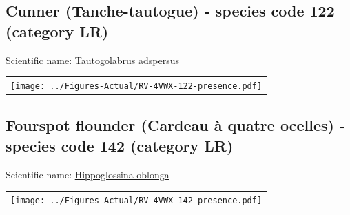 \documentclass[12pt]{article}\usepackage[]{graphicx}\usepackage[]{color}
\begin{document}
\renewcommand\thefigure{\thesubsection\Alph{figure}}

\setcounter{figure}{0}

\hypertarget{sec:122}{%
\subsection{Cunner (Tanche-tautogue) - species code 122 (category LR)}\label{sec:122}}

  


Scientific name: \href{http://www.marinespecies.org/aphia.php?p=taxdetails\&id=159785}{Tautogolabrus adspersus} \newline
\begin{minipage}{1.0\textwidth}
 \begin{tabular}{c}
\texttt{[image: ../Figures-Actual/RV-4VWX-122-presence.pdf]} \\ 
\end{tabular} 
\end{minipage}
\clearpage

\renewcommand\thefigure{\thesubsection\Alph{figure}}

\setcounter{figure}{0}

\hypertarget{sec:142}{%
\subsection{Fourspot flounder (Cardeau à quatre ocelles) - species code 142 (category LR)}\label{sec:142}}

  


Scientific name: \href{http://www.marinespecies.org/aphia.php?p=taxdetails\&id=158833}{Hippoglossina oblonga} \newline
\begin{minipage}{1.0\textwidth}
 \begin{tabular}{c}
\texttt{[image: ../Figures-Actual/RV-4VWX-142-presence.pdf]} \\ 
\end{tabular} 
\end{minipage}
\clearpage
\end{document}
